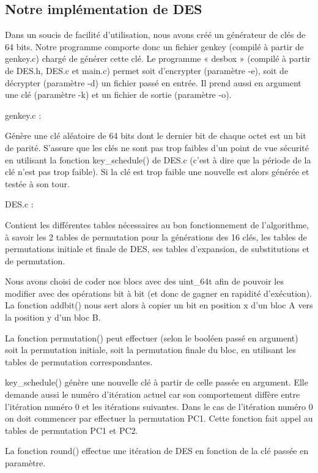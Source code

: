\documentclass[a4paper,12pt]{article}
\begin{document}
\subsection{Notre implémentation de DES}

Dans un soucis de facilité d'utilisation, nous avons créé un générateur de clés de 64 bits. Notre programme comporte donc un fichier genkey (compilé à partir de genkey.c) chargé de générer cette clé. Le programme « desbox » (compilé à partir de DES.h, DES.c et main.c) permet soit d'encrypter (paramètre -e), soit de décrypter (paramètre -d) un fichier passé en entrée. Il prend aussi en argument une clé (paramètre -k) et un fichier de sortie (paramètre -o).

genkey.c :

	Génère une clé aléatoire de 64 bits dont le dernier bit de chaque octet est un bit de parité. S'assure que les clés ne sont pas trop faibles d'un point de vue sécurité en utilisant la fonction key\_schedule() de DES.c (c'est à dire que la période de la clé n'est pas trop faible). Si la clé est trop faible une nouvelle est alors générée et testée à son tour.

DES.c :

	Contient les différentes tables nécessaires au bon fonctionnement de l'algorithme, à savoir les 2 tables de permutation pour la générations des 16 clés, les tables de permutations initiale et finale de DES, ses tables d'expansion, de substitutions et de permutation.
	
	Nous avons choisi de coder nos blocs avec des uint\_64t afin de pouvoir les modifier avec des opérations bit à bit (et donc de gagner en rapidité d'exécution). La fonction addbit() nous sert alors à copier un bit en position x d'un bloc A vers la position y d'un bloc B.
	
	La fonction permutation() peut effectuer (selon le booléen passé en argument) soit la permutation initiale, soit la permutation finale du bloc, en utilisant les tables de permutation correspondantes.
	
	key\_schedule() génère une nouvelle clé à partir de celle passée en argument. Elle demande aussi le numéro d'itération actuel car son comportement diffère entre l'itération numéro 0 et les itérations suivantes. Dans le cas de l'itération numéro 0 on doit commencer par effectuer la permutation PC1. Cette fonction fait appel au tables de permutation PC1 et PC2.
	
	La fonction round() effectue une itération de DES en fonction de la clé passée en paramètre.
	
\end{document}
